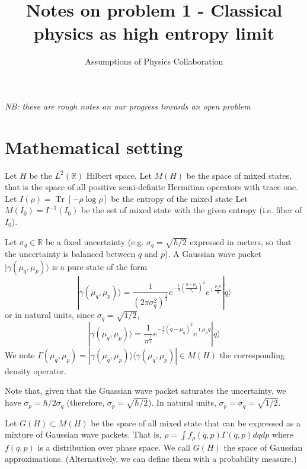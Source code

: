 \documentclass[11pt]{article}
\def\>{\rangle}
\def\<{\langle}
\DeclareMathOperator{\Tr}{Tr}
\begin{document}
	\title{Notes on problem 1 - Classical physics as high entropy limit}
	\author{Assumptions of Physics Collaboration}

	\date{}

	\maketitle

\emph{NB: these are rough notes on our progress towards an open problem}

\section{Mathematical setting}

Let $H$ be the $L^2(\mathbb{R})$ Hilbert space. Let $M(H)$ be the space of mixed states, that is the space of all positive semi-definite Hermitian operators with trace one. Let $I(\rho) = \Tr [-\rho \log \rho]$ be the entropy of the mixed state Let $M(I_0) = I^{-1}(I_0)$ be the set of mixed state with the given entropy (i.e. fiber of $I_0$).

Let $\sigma_q \in \mathbb{R}$ be a fixed uncertainty (e.g. $\sigma_q = \sqrt{\hbar/2}$ expressed in meters, so that the uncertainty is balanced between $q$ and $p$). A Gaussian wave packet $|\gamma(\mu_q,\mu_p)\>$ is a pure state of the form
\begin{equation}
	|\gamma(\mu_q,\mu_p)\> = \frac{1}{(2 \pi \sigma_q^2)^{\frac{1}{4}}} e^{-\frac{1}{4} \left(\frac{q-\mu_q}{\sigma_q}\right)^2} e^{\imath \frac{\mu_p q}{\hbar}} | q \>
\end{equation}
or in natural units, since $\sigma_q = \sqrt{1/2}$,
\begin{equation}
	|\gamma(\mu_q,\mu_p)\> = \frac{1}{\pi^{\frac{1}{4}}} e^{-\frac{1}{2} \left(q-\mu_q\right)^2} e^{\imath \mu_p q} | q \>
\end{equation}
We note $\Gamma(\mu_q,\mu_p) = |\gamma(\mu_q,\mu_p)\> \<\gamma(\mu_q,\mu_p)| \in M(H)$ the corresponding density operator.

Note that, given that the Guassian wave packet saturates the uncertainty, we have $\sigma_p = \hbar / 2 \sigma_q$ (therefore, $\sigma_p = \sqrt{\hbar/2}$). In natural units, $\sigma_p = \sigma_q = \sqrt{1/2}$.

Let $G(H) \subset M(H)$ be the space of all mixed state that can be expressed as a mixture of Gaussian wave packets. That is, $\rho = \int f_\rho(q, p) \Gamma(q, p) dq dp$ where $f(q, p)$ is a distribution over phase space. We call $G(H)$ the space of Gaussian approximations. (Alternatively, we can define them with a probability measure.)
\end{document}
